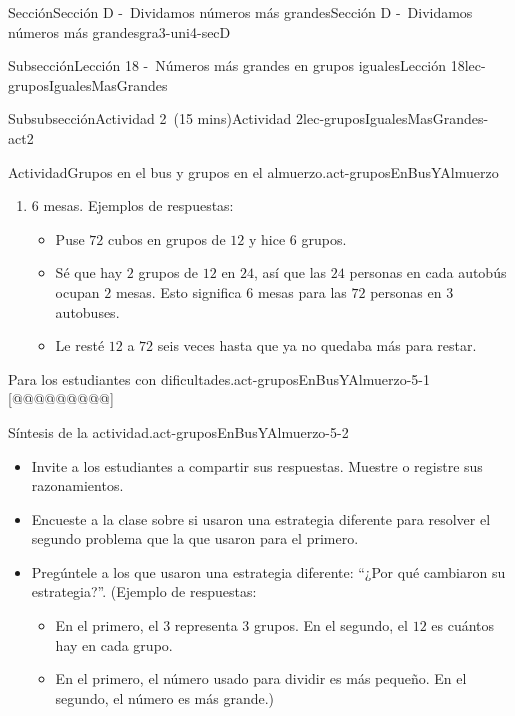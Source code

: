 \documentclass[oneside,10pt,]{article}
\begin{document}
\begin{sectionptx}{Sección}{Sección D -~Dividamos números más grandes}{}{Sección D -~Dividamos números más grandes}{}{}{gra3-uni4-secD}
\begin{subsectionptx}{Subsección}{Lección 18 -~Números más grandes en grupos iguales}{}{Lección 18}{}{}{lec-gruposIgualesMasGrandes}
\begin{subsubsectionptx}{Subsubsección}{Actividad 2~(15 mins)}{}{Actividad 2}{}{}{lec-gruposIgualesMasGrandes-act2}
\begin{activity}{Actividad}{Grupos en el bus y grupos en el almuerzo.}{act-gruposEnBusYAlmuerzo}
\begin{enumerate}
\begin{itemize}[label=\textbullet]
\item{}Si ponemos \(10\) personas en cada autobús, eso son 30 personas. Si ponemos \(10\) personas más en cada autobús, eso son \(60\) personas, y hay \(12\) personas más que aún no están en un autobús. Al poner \(4\) personas más en cada autobús, ubicamos esas \(12\) personas. \(10 + 10 + 4 = 24\).%
\item{}Sé que \(3\) grupos de \(20\) son \(60\) y \(3\) grupos de \(4\) son \(12\), así que \(3\) grupos de \(24\) son \(72\).%
\end{itemize}
\item{}\(6\) mesas. Ejemplos de respuestas:%
%
\begin{itemize}[label=\textbullet]
\item{}Puse \(72\) cubos en grupos de \(12\) y hice \(6\) grupos.%
\item{}Sé que hay \(2\) grupos de \(12\) en \(24\), así que las \(24\) personas en cada autobús ocupan \(2\) mesas. Esto significa \(6\) mesas para las \(72\) personas en \(3\) autobuses.%
\item{}Le resté \(12\) a \(72\) seis veces hasta que ya no quedaba más para restar.%
\end{itemize}
\end{enumerate}
\end{activity}%
\par
\begin{paragraphs}{Para los estudiantes con dificultades.}{act-gruposEnBusYAlmuerzo-5-1}%
[@@@@@@@@@]%
\end{paragraphs}%
\begin{paragraphs}{Síntesis de la actividad.}{act-gruposEnBusYAlmuerzo-5-2}%
%
\begin{itemize}[label=\textbullet]
\item{}Invite a los estudiantes a compartir sus respuestas. Muestre o registre sus razonamientos.%
\item{}Encueste a la clase sobre si usaron una estrategia diferente para resolver el segundo problema que la que usaron para el primero.%
\item{}Pregúntele a los que usaron una estrategia diferente: ``¿Por qué cambiaron su estrategia?''. (Ejemplo de respuestas:%
%
\begin{itemize}[label=$\circ$]
\item{}En el primero, el \(3\) representa \(3\) grupos. En el segundo, el \(12\) es cuántos hay en cada grupo.%
\item{}En el primero, el número usado para dividir es más pequeño. En el segundo, el número es más grande.)%

\end{itemize}
\end{itemize}
\end{paragraphs}
\end{subsubsectionptx}
\end{subsectionptx}
\end{sectionptx}
\end{document}
